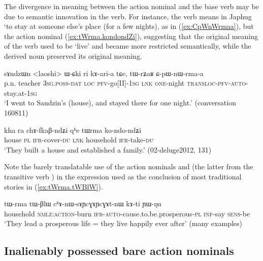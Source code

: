 
The divergence in meaning between the action nominal and the base verb may be due to semantic innovation in the verb. For instance, the verb  means in Japhug `to stay at someone else's place (for a few nights), as in (\ref{ex:CpWnWrmaa}), but the action nominal  (\ref{ex:tWrma.kondondZi}), suggesting that the original meaning of the verb used to be `live' and became more restricted semantically, while the derived noun preserved its original meaning.

\begin{exe}
\ex \label{ex:CpWnWrmaa}
\gll sɤndzɯn <laoshi> ɯ-ɕki ri kɤ-ari-a tɕe, tɯ-rʑaʁ ɕ-pɯ-nɯ-rma-a \\
p.n. teacher \textsc{3sg}.\textsc{poss}-\textsc{dat} \textsc{loc} \textsc{pfv}-go[II]-\textsc{1sg} \textsc{lnk} \textsc{one}-night \textsc{transloc}-\textsc{pfv}-\textsc{auto}-stay.at-\textsc{1sg} \\
\glt `I went to Sandzin's (house), and stayed there for one night.' (conversation 160811)
\end{exe}

\begin{exe}
\ex \label{ex:tWrma.kondondZi}
\gll kha ra chɤ-fkaβ-ndʑi qʰe tɯrma ko-ndo-ndʑi \\
house \textsc{pl} \textsc{ifr}-cover-\textsc{du} \textsc{lnk} household \textsc{ifr}-take-\textsc{du} \\
\glt `They built a house and established a family.' (02-deluge2012, 131)
\end{exe}

Note the barely translatable use of the action nominals  and  (the latter from the transitive verb ) in the expression used as the conclusion of most traditional stories in (\ref{ex:tWrma.tWBlW}).

\begin{exe}
\ex \label{ex:tWrma.tWBlW}
\gll  tɯ-rma tɯ-βlɯ cʰɤ-nɯ-sɤɲcɣɤɲcɣɤt-nɯ kɤ-ti ɲɯ-ŋu \\
household \textsc{nmlz}:\textsc{action}-burn \textsc{ifr}-\textsc{auto}-cause.to.be.prosperous-\textsc{pl} \textsc{inf}-say \textsc{sens}-be \\
\glt `They lead a prosperous life = they live happily ever after' (many examples)
\end{exe}

\subsection{Inalienably possessed bare action nominals} \label{sec:bare.action.nominals}
